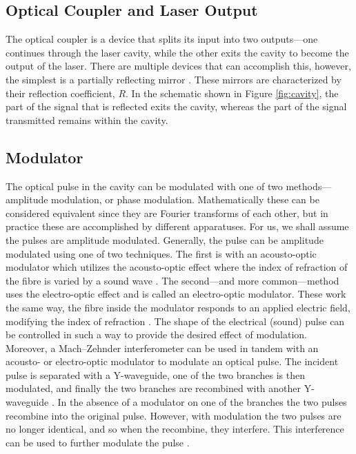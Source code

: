 \subsection{Optical Coupler and Laser Output}
The optical coupler is a device that splits its input into two outputs---one continues through the laser cavity, while the other exits the cavity to become the output of the laser. There are multiple devices that can accomplish this, however, the simplest is a partially reflecting mirror \cite{alazzawi}. These mirrors are characterized by their reflection coefficient, $R$. In the schematic shown in Figure \ref{fig:cavity}, the part of the signal that is reflected exits the cavity, whereas the part of the signal transmitted remains within the cavity. \\

\subsection{Modulator}
The optical pulse in the cavity can be modulated with one of two methods---amplitude modulation, or phase modulation. Mathematically these can be considered equivalent since they are Fourier transforms of each other, but in practice these are accomplished by different apparatuses. For us, we shall assume the pulses are amplitude modulated. Generally, the pulse can be amplitude modulated using one of two techniques. The first is with an acousto-optic modulator which utilizes the acousto-optic effect where the index of refraction of the fibre is varied by a sound wave \cite{hausbook, karim}. The second---and more common---method uses the electro-optic effect and is called an electro-optic modulator. These work the same way, the fibre inside the modulator responds to an applied electric field, modifying the index of refraction \cite{agrawal2002, goldstein, hausbook, karim}. The shape of the electrical (sound) pulse can be controlled in such a way to provide the desired effect of modulation. \\

Moreover, a Mach--Zehnder interferometer can be used in tandem with an acousto- or electro-optic modulator to modulate an optical pulse. The incident pulse is separated with a Y-waveguide, one of the two branches is then modulated, and finally the two branches are recombined with another Y-waveguide \cite{alazzawi, hausbook, karim}. In the absence of a modulator on one of the branches the two pulses recombine into the original pulse. However, with modulation the two pulses are no longer identical, and so when the recombine, they interfere. This interference can be used to further modulate the pulse \cite{agrawal2002, agrawal2013, hausbook, karim}. \\

